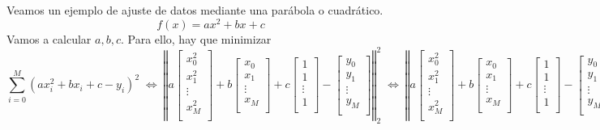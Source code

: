 \begin{ejemplo}
Veamos un ejemplo de ajuste de datos mediante una parábola o cuadrático.
\[ f(x) = ax^2 + bx + c \]
Vamos a calcular $a, b, c$. Para ello, hay que minimizar
\[ \sum_{i=0}^M (ax_i^2 + bx_i + c - y_i)^2
\; \Leftrightarrow \;
\left\Vert a \begin{bmatrix}
x_0^2 \\
x_1^2 \\
\vdots \\
x_M^2 \\
\end{bmatrix}
+ b \begin{bmatrix}
x_0 \\
x_1 \\
\vdots \\
x_M\\
\end{bmatrix}
+ c \begin{bmatrix}
1 \\
1 \\
\vdots \\
1 \\
\end{bmatrix}
- \begin{bmatrix}
y_0 \\
y_1 \\
\vdots \\
y_M \\
\end{bmatrix}
\right\Vert _2^2
\; \Leftrightarrow \;
\left\Vert a \begin{bmatrix}
x_0^2 \\
x_1^2 \\
\vdots \\
x_M^2 \\
\end{bmatrix}
+ b \begin{bmatrix}
x_0 \\
x_1 \\
\vdots \\
x_M\\
\end{bmatrix}
+ c \begin{bmatrix}
1 \\
1 \\
\vdots \\
1 \\
\end{bmatrix}
- \begin{bmatrix}
y_0 \\
y_1 \\
\vdots \\
y_M \\
\end{bmatrix}
\right\Vert _2 \]


\end{ejemplo}
